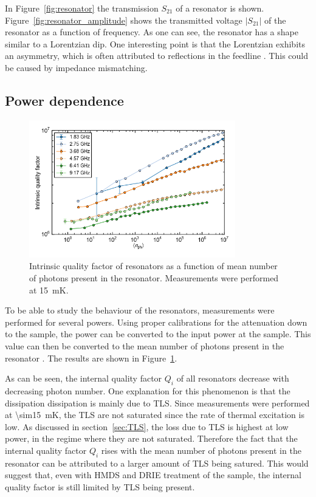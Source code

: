 \documentclass[12pt]{report}
\begin{document}
 In Figure~\ref{fig:resonator} the transmission $S_{21}$ of a resonator is shown. Figure~\ref{fig:resonator_amplitude} shows the transmitted voltage $|S_{21}|$ of the resonator as a function of frequency. As one can see, the resonator has a shape similar to a Lorentzian dip. One interesting point is that the Lorentzian exhibits an asymmetry, which is often attributed to reflections in the feedline \cite[p.~192]{Geerlings}. This could be caused by impedance mismatching.


\subsection{Power dependence}
\label{sec:resonator:results:power_dependence}

\begin{figure}
    \centering
    \includegraphics[width=0.8\textwidth]{Figures/Qi_vs_n_photon.png}
    \caption{Intrinsic quality factor of resonators as a function of mean number of photons present in the resonator. Measurements were performed at \SI{15}{\milli \kelvin}.}
    \label{fig:Qi_vs_n_photon}
\end{figure}
To be able to study the behaviour of the resonators, measurements were performed for several powers. Using proper calibrations for the attenuation down to the sample, the power can be converted to the input power at the sample. This value can then be converted to the mean number of photons present in the resonator \cite{DRIE}. The results are shown in Figure~\ref{fig:Qi_vs_n_photon}.

As can be seen, the internal quality factor $Q_i$ of all resonators decrease with decreasing photon number. One explanation for this phenomenon is that the dissipation dissipation is mainly due to TLS. Since measurements were performed at \SI{\sim15}{mK}, the TLS are not saturated since the rate of thermal excitation is low. As discussed in section~\ref{sec:TLS}, the loss due to TLS is highest at low power, in the regime where they are not saturated. Therefore the fact that the internal quality factor $Q_i$ rises with the mean number of photons present in the resonator can be attributed to a larger amount of TLS being satured. This would suggest that, even with HMDS and DRIE treatment of the sample, the internal quality factor is still limited by TLS being present.
\end{document}
